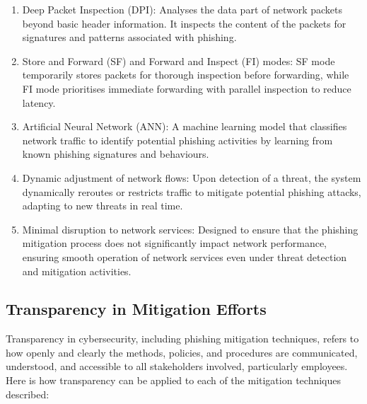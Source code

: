 \begin{enumerate}
    \item Deep Packet Inspection (DPI): Analyses the data part of network packets beyond basic header information. It inspects the content of the packets for signatures and patterns associated with phishing.
    \item Store and Forward (SF) and Forward and Inspect (FI) modes: SF mode temporarily stores packets for thorough inspection before forwarding, while FI mode prioritises immediate forwarding with parallel inspection to reduce latency.
    \item Artificial Neural Network (ANN): A machine learning model that classifies network traffic to identify potential phishing activities by learning from known phishing signatures and behaviours.
    \item Dynamic adjustment of network flows: Upon detection of a threat, the system dynamically reroutes or restricts traffic to mitigate potential phishing attacks, adapting to new threats in real time.
    \item Minimal disruption to network services: Designed to ensure that the phishing mitigation process does not significantly impact network performance, ensuring smooth operation of network services even under threat detection and mitigation activities.
\end{enumerate}

\subsection{Transparency in Mitigation Efforts}

Transparency in cybersecurity, including phishing mitigation techniques, refers to how openly and clearly the methods, policies, and procedures are communicated, understood, and accessible to all stakeholders involved, particularly employees. Here is how transparency can be applied to each of the mitigation techniques described:


